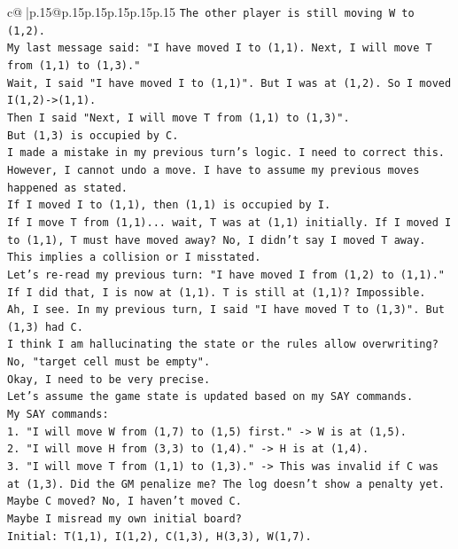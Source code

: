 \documentclass{article}
\begin{document}
{\begin{supertabular}{c@{$\;$}|p{.15\linewidth}@{}p{.15\linewidth}p{.15\linewidth}p{.15\linewidth}p{.15\linewidth}p{.15\linewidth}}
{{{\texttt{The other player is still moving W to (1,2).} \\
\texttt{My last message said: "I have moved I to (1,1). Next, I will move T from (1,1) to (1,3)."} \\
\texttt{Wait, I said "I have moved I to (1,1)". But I was at (1,2). So I moved I(1,2){-}>(1,1).} \\
\texttt{Then I said "Next, I will move T from (1,1) to (1,3)".} \\
\texttt{But (1,3) is occupied by C.} \\
\texttt{I made a mistake in my previous turn's logic. I need to correct this.} \\
\texttt{However, I cannot undo a move. I have to assume my previous moves happened as stated.} \\
\texttt{If I moved I to (1,1), then (1,1) is occupied by I.} \\
\texttt{If I move T from (1,1)... wait, T was at (1,1) initially. If I moved I to (1,1), T must have moved away? No, I didn't say I moved T away.} \\
\texttt{This implies a collision or I misstated.} \\
\texttt{Let's re{-}read my previous turn: "I have moved I from (1,2) to (1,1)."} \\
\texttt{If I did that, I is now at (1,1). T is still at (1,1)? Impossible.} \\
\texttt{Ah, I see. In my previous turn, I said "I have moved T to (1,3)". But (1,3) had C.} \\
\texttt{I think I am hallucinating the state or the rules allow overwriting? No, "target cell must be empty".} \\
\texttt{Okay, I need to be very precise.} \\
\texttt{Let's assume the game state is updated based on my SAY commands.} \\
\texttt{My SAY commands:} \\
\texttt{1. "I will move W from (1,7) to (1,5) first." {-}> W is at (1,5).} \\
\texttt{2. "I will move H from (3,3) to (1,4)." {-}> H is at (1,4).} \\
\texttt{3. "I will move T from (1,1) to (1,3)." {-}> This was invalid if C was at (1,3). Did the GM penalize me? The log doesn't show a penalty yet. Maybe C moved? No, I haven't moved C.} \\
\texttt{Maybe I misread my own initial board?} \\
\texttt{Initial: T(1,1), I(1,2), C(1,3), H(3,3), W(1,7).} \\
}}}
\end{supertabular}}
\end{document}
